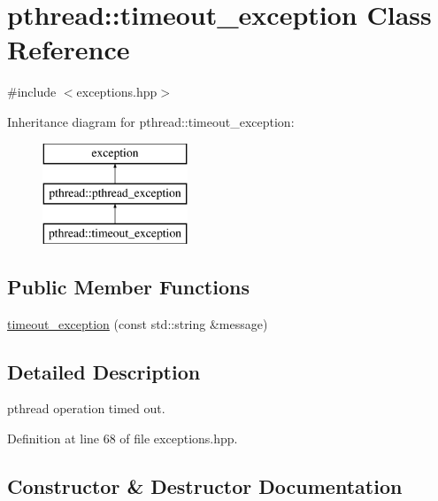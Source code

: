 \hypertarget{classpthread_1_1timeout__exception}{}\section{pthread\+:\+:timeout\+\_\+exception Class Reference}
\label{classpthread_1_1timeout__exception}


{\ttfamily \#include $<$exceptions.\+hpp$>$}

Inheritance diagram for pthread\+:\+:timeout\+\_\+exception\+:\begin{figure}[H]
\begin{center}
\leavevmode
\includegraphics[height=3.000000cm]{classpthread_1_1timeout__exception}
\end{center}
\end{figure}
\subsection*{Public Member Functions}
\begin{DoxyCompactItemize}
\item 
\hyperlink{classpthread_1_1timeout__exception_aad3e5ac05faa1f0d8a7779678e70ad22}{timeout\+\_\+exception} (const std\+::string \&message)
\end{DoxyCompactItemize}


\subsection{Detailed Description}
pthread operation timed out. 

Definition at line 68 of file exceptions.\+hpp.



\subsection{Constructor \& Destructor Documentation}
